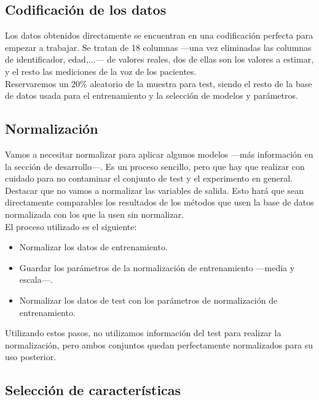 \subsection{Codificación de los datos}

Los datos obtenidos directamente se encuentran en una codificación perfecta para empezar a trabajar. Se tratan de 18 columnas ---una vez eliminadas las columnas de identificador, edad,...--- de valores reales, dos de ellas son los valores a estimar, y el resto las mediciones de la voz de los pacientes.\\

Reservaremos un 20\% aleatorio de la muestra para test, siendo el resto de la base de datos usada para el entrenamiento y la selección de modelos y parámetros.\\

\subsection{Normalización}

Vamos a necesitar normalizar para aplicar algunos modelos ---más información en la sección de desarrollo---. Es un proceso sencillo, pero que hay que realizar con cuidado para no contaminar el conjunto de test y el experimento en general.\\

Destacar que no vamos a normalizar las variables de salida. Esto hará que sean directamente comparables los resultados de los métodos que usen la base de datos normalizada con los que la usen sin normalizar.\\

El proceso utilizado es el siguiente:
\begin{itemize}
\item Normalizar los datos de entrenamiento.
\item Guardar los parámetros de la normalización de entrenamiento ---media y escala---.
\item Normalizar los datos de test con los parámetros de normalización de entrenamiento.
\end{itemize}

Utilizando estos pasos, no utilizamos información del test para realizar la normalización, pero ambos conjuntos quedan perfectamente normalizados para su uso posterior.\\

\subsection{Selección de características}

